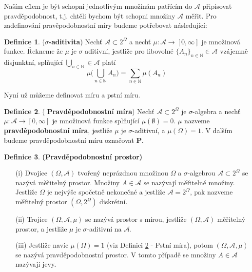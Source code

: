 \documentclass[a4]{report}
\theoremstyle{definition}
\newtheorem{definition}{Definice}[section]
\begin{document}
{Naším cílem je být schopni jednotlivým množinám patřícím do $\mathcal{A}$ připisovat pravděpodobnost, t.j. chtěli bychom být schopni množiny $\mathcal{A}$ měřit. Pro zadefinování pravěpodobnostní míry budeme potřebovat následující:


\begin{definition}\label{SihmaAditivitaDef}(\textbf{$\sigma$-aditivita})
Nechť $\mathcal{A}\subset 2^{\Omega}$ a nechť $\mu : \mathcal{A} \longrightarrow [0,\infty]$ je množinová funkce. Řekneme že $\mu$ je $\sigma$ aditivní, jestliže pro libovolné $\lbrace A_{n} \rbrace_{n\in \mathbb{N}} \in \mathcal{A} $ vzájemně disjunktní, splňující $\bigcup_{n \in \mathbb{N}}\in \mathcal{A}$ platí 
\begin{equation}\label{SihmaAditivitaRce}\nonumber
\mu \bigg( \bigcup_{n \in \mathbb{N}}A_{n} \bigg) = \sum_{n \in \mathbb{N}} \mu(A_{n})
\end{equation}

\end{definition}

Nyní už můžeme definovat míru a pstní míru.

\begin{definition}\label{MiraPstniMiraDef}(\textbf{ Pravděpodobnostní míra})
Nechť $\mathcal{A} \subset 2^{\Omega}$ je $\sigma$-algebra a nechť $\mu:\mathcal{A} \longrightarrow [0,\infty]$ je množinová funkce splňující $\mu(\emptyset) = 0$. $\mu$ nazveme \textbf{pravděpodobnostní míra}, jestliže $\mu$ je $\sigma$-aditivní, a $\mu(\Omega) = 1$.
V dalším budeme pravděpodobnostní míru označovat $\mathbf{P}$.
\end{definition}

\begin{definition}\label{PstniProstor}\textbf{(Pravděpodobnostní prostor)}
\begin{itemize}
\item[(i)] Dvojice $(\Omega, \mathcal{A})$ tvořený neprázdnou množinou $\Omega$ a $\sigma$-algebrou $\mathcal{A}\subset 2^{\Omega}$ se nazývá měřitelný prostor. Množiny $A \in \mathcal{A}$ se nazývají měřitelné množiny. Jestliže $\Omega$ je nejvýše spočetně nekonečné a jestliže $\mathcal{A} = 2^{\Omega}$, pak nazveme měřitelný prostor $(\Omega, 2^{\Omega})$ diskrétní.
\item[(ii)] Trojice $(\Omega, \mathcal{A}, \mu)$ se nazývá prostor s mírou, jestliže $(\Omega, \mathcal{A})$ měřitelný prostor, a jestliže $\mu$ je $\sigma$-aditivní na $\mathcal{A}$.
\item[(iii)] Jestliže navíc $\mu(\Omega)= 1$ (viz Definici \ref{MiraPstniMiraDef} - Pstní míra), potom $(\Omega, \mathcal{A}, \mu)$ se nazývá pravděpodobnostní prostor. V tomto případě se množiny $A \in \mathcal{A}$ nazývají jevy.
\end{itemize}
\end{definition}

}
\end{document}
